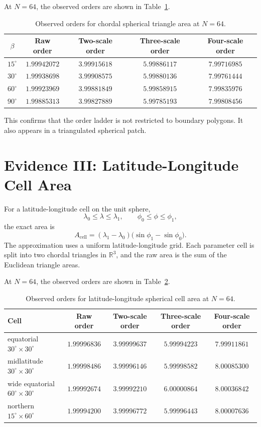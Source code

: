 \documentclass[11pt]{article}
\begin{document}
At $N=64$, the observed orders are shown in
Table~\ref{tab:triangle-orders}.

\begin{table}[ht]
\centering
\small
\begin{tabular}{ccccc}
\toprule
$\beta$ & Raw order & Two-scale order & Three-scale order & Four-scale order \\
\midrule
$15^\circ$ & $1.99942072$ & $3.99915618$ & $5.99886117$ & $7.99716985$ \\
$30^\circ$ & $1.99938698$ & $3.99908575$ & $5.99880136$ & $7.99761444$ \\
$60^\circ$ & $1.99923969$ & $3.99881849$ & $5.99858915$ & $7.99835976$ \\
$90^\circ$ & $1.99885313$ & $3.99827889$ & $5.99785193$ & $7.99808456$ \\
\bottomrule
\end{tabular}
\caption{Observed orders for chordal spherical triangle area at $N=64$.}
\label{tab:triangle-orders}
\end{table}

This confirms that the order ladder is not restricted to boundary polygons.
It also appears in a triangulated spherical patch.

\section{Evidence III: Latitude-Longitude Cell Area}

For a latitude-longitude cell on the unit sphere,
\[
  \lambda_0 \leq \lambda \leq \lambda_1,
  \qquad
  \phi_0 \leq \phi \leq \phi_1,
\]
the exact area is
\[
  A_{\mathrm{cell}}
  =
  (\lambda_1-\lambda_0)
  \bigl(\sin\phi_1-\sin\phi_0\bigr).
\]
The approximation uses a uniform latitude-longitude grid.  Each parameter
cell is split into two chordal triangles in $\mathbb{R}^3$, and the raw area
is the sum of the Euclidean triangle areas.

At $N=64$, the observed orders are shown in
Table~\ref{tab:latlon-orders}.

\begin{table}[ht]
\centering
\small
\begin{tabular}{lcccc}
\toprule
Cell & Raw order & Two-scale order & Three-scale order & Four-scale order \\
\midrule
equatorial $30^\circ\times30^\circ$ & $1.99996836$ & $3.99999637$ & $5.99994223$ & $7.99911861$ \\
midlatitude $30^\circ\times30^\circ$ & $1.99998486$ & $3.99996146$ & $5.99998582$ & $8.00085300$ \\
wide equatorial $60^\circ\times30^\circ$ & $1.99992674$ & $3.99992210$ & $6.00000864$ & $8.00036842$ \\
northern $15^\circ\times60^\circ$ & $1.99994200$ & $3.99996772$ & $5.99996443$ & $8.00007636$ \\
\bottomrule
\end{tabular}
\caption{Observed orders for latitude-longitude spherical cell area at $N=64$.}
\label{tab:latlon-orders}
\end{table}
\end{document}
